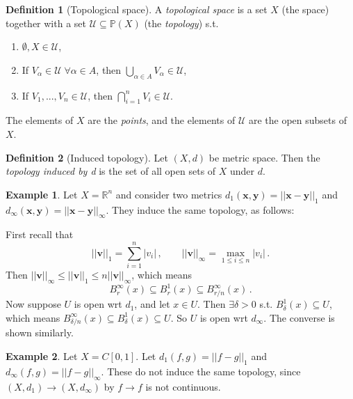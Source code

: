 \documentclass[a4paper,11pt]{article}
\theoremstyle{definition}
\newtheorem*{defn}{Definition}
\newtheorem*{ex}{Example}
\numberwithin{equation}{section}
\begin{document}
\begin{defn}[Topological space]
A \emph{topological space} is a set $X$ (the space) together with a set $\mathcal{U}\subseteq\mathbb{P}(X)$ (the \emph{topology}) s.t. 
\begin{enumerate}
    \item $\emptyset, X\in \mathcal{U}$,
    \item If $V_\alpha\in \mathcal{U}\;\forall\alpha\in A$, then $\bigcup\limits_{\alpha\in A} V_\alpha\in \mathcal{U}$,
    \item If $V_1,...,V_n\in \mathcal{U}$, then $\bigcap\limits^n_{i=1}V_i\in \mathcal{U}$.
\end{enumerate}
The elements of $X$ are the \emph{points}, and the elements of $\mathcal{U}$ are the open subsets of $X$.
\end{defn}

\begin{defn}[Induced topology]
Let $(X,d)$ be metric space. Then the \emph{topology induced by d} is the set of all open sets of $X$ under $d$.
\end{defn}

\begin{ex}
Let $X=\mathbb{R}^n$ and consider two metrics $d_1(\mathbf{x},\mathbf{y})=||\mathbf{x}-\mathbf{y}||_1$ and $d_\infty(\mathbf{x},\mathbf{y})=||\mathbf{x}-\mathbf{y}||_\infty$. They induce the same topology, as follows:

First recall that 
\begin{equation}
    ||\mathbf{v}||_1 = \sum_{i=1}^n|v_i|\,,\qquad||\mathbf{v}||_\infty = \max_{1\leq i\leq n}|v_i|\,.
\end{equation}
Then $||\mathbf{v}||_\infty\leq||\mathbf{v}||_1\leq n||\mathbf{v}||_\infty$, which means
\begin{equation}
    B^\infty_r(x)\subseteq B^1_r(x)\subseteq B^\infty_{r/n}(x)\,.
\end{equation}
Now suppose $U$ is open wrt $d_1$, and let $x\in U$. Then $\exists\delta>0$ s.t. $B^1_\delta(x)\subseteq U$, which means $B^\infty_{\delta/n}(x)\subseteq B^1_\delta(x)\subseteq U$. So $U$ is open wrt $d_\infty$. The converse is shown similarly.
\end{ex}

\begin{ex}
Let $X=C[0,1]$. Let $d_1(f,g)=||f-g||_1$ and $d_\infty(f,g)=||f-g||_\infty$. These do not induce the same topology, since $(X,d_1)\rightarrow(X,d_\infty)$ by $f\rightarrow f$ is not continuous.
\end{ex}
\end{document}
